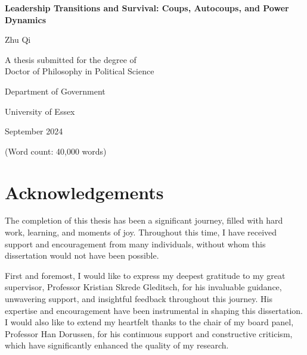 \documentclass[
  12pt,
]{report}
\author{}
\date{}
\renewcommand*\contentsname{Table of contents}
\newcommand\contentsname{Table of contents}
\begin{document}
\begin{titlepage}
  \begin{center}
    \vspace*{2cm}
    
    \Huge{\textbf{Leadership Transitions and Survival: Coups, Autocoups, and Power Dynamics}}
    
    \vspace{1.5cm}
    
    \Large{Zhu Qi}
    
    \vspace{5cm}
    
    \large{A thesis submitted for the degree of \\ Doctor of Philosophy in Political Science}
    
    \vspace{0.8cm}
    
    \large{Department of Government}
    \vspace{0.5cm}
    
    \large{University of Essex}
    
    \vspace{1.5cm}
    
    \large{September 2024}
    \vspace{2cm}
    
    \large{(Word count: 40,000 words)}
    
  \end{center}
\end{titlepage}

\renewcommand*\contentsname{Contents}
{
\hypersetup{linkcolor=}
\setcounter{tocdepth}{2}
\tableofcontents
}
\listoffigures
\listoftables
{}
\chapter*{Acknowledgements}\label{acknowledgements}

The completion of this thesis has been a significant journey, filled
with hard work, learning, and moments of joy. Throughout this time, I
have received support and encouragement from many individuals, without
whom this dissertation would not have been possible.

First and foremost, I would like to express my deepest gratitude to my
great supervisor, Professor Kristian Skrede Gleditsch, for his
invaluable guidance, unwavering support, and insightful feedback
throughout this journey. His expertise and encouragement have been
instrumental in shaping this dissertation. I would also like to extend
my heartfelt thanks to the chair of my board panel, Professor Han
Dorussen, for his continuous support and constructive criticism, which
have significantly enhanced the quality of my research.
\end{document}

